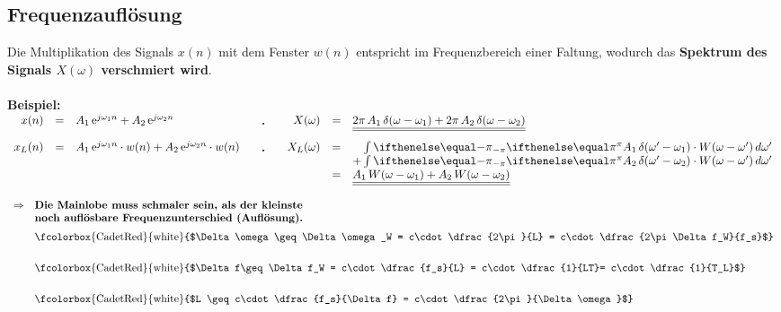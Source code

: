 	\subsection{Frequenzauflösung}
		 Die Multiplikation des Signals $x(n)$ mit dem Fenster $w(n)$ entspricht im Frequenzbereich einer Faltung, wodurch das \textbf{Spektrum des Signals $X(\omega)$ verschmiert wird}.\\[0.2cm]
		 \\[0.5cm]
		 \textbf{Beispiel:}\\
		 $\begin{array}{rcl c rcl}
		 x(n) &= &A_1\,\e^{j\omega_1n} + A_2\,\e^{j\omega_2n}&\quad\FT&\quad
		 X(\omega) &= &\underline{\underline{2\pi\,A_1\,\delta(\omega-\omega_1) + 2\pi\,A_2\,\delta(\omega-\omega_2)}}\\[0.4cm]
		 x_L(n) & = & A_1\,\e^{j\omega_1n}\cdot w(n) + A_2\,\e^{j\omega_2n}\cdot w(n)&
		 \quad\FT &\quad X_L(\omega)&= &\;\;\;\;\!\myint{-\pi}{\pi}{A_1\,\delta(\omega'-\omega_1)\cdot W(\omega-\omega')}{\omega'} \\ &&&&&& + \myint{-\pi}{\pi}{A_2\,\delta(\omega'-\omega_2)\cdot W(\omega-\omega')}{\omega'}\\
		 &&&&&= & \underline{\underline{A_1\,W(\omega-\omega_1) + A_2\,W(\omega-\omega_2)}}
		 \end{array}$\\
		 \begin{minipage}{0.55\textwidth}
			$\begin{array}{ll}
			\Rightarrow& \textbf{Die Mainlobe muss schmaler sein, als der kleinste}\\ &\textbf{noch auflösbare Frequenzunterschied (Auflösung).}\\[0.2cm]
			&\text{\fcolorbox{CadetRed}{white}{$\Delta\omega \geq \Delta\omega_W = c\cdot\dfrac{2\pi}{L} = c\cdot\dfrac{2\pi\Delta f_W}{f_s}$}}\\[0.6cm]
			&\text{\fcolorbox{CadetRed}{white}{$\Delta f\geq \Delta f_W = c\cdot\dfrac{f_s}{L} = c\cdot\dfrac{1}{LT}= c\cdot\dfrac{1}{T_L}$}}\\[0.6cm]
			&\text{\fcolorbox{CadetRed}{white}{$L \geq c\cdot\dfrac{f_s}{\Delta f} = c\cdot\dfrac{2\pi}{\Delta \omega}$}}\end{array}$
		 \end{minipage}\begin{minipage}{0.05\textwidth}$ $\end{minipage}
